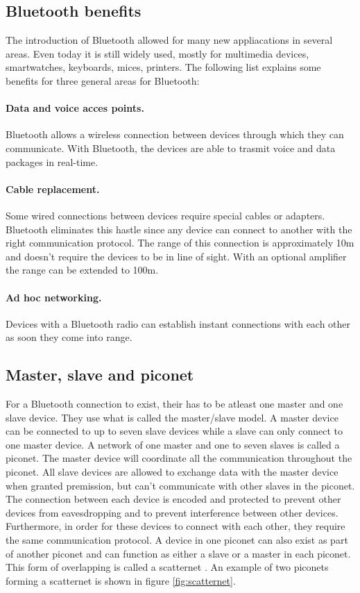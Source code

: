 \documentclass[a4paper, 11pt]{report}
\begin{document}
	\subsection{Bluetooth benefits}
The introduction of Bluetooth allowed for many new appliacations in several areas. Even today it is still widely used, mostly for multimedia devices, smartwatches, keyboards, mices, printers. The following list explains some benefits for three general areas for Bluetooth:
		\paragraph{Data and voice acces points.}
Bluetooth allows a wireless connection between devices through which they can communicate. With Bluetooth, the devices are able to trasmit voice and data packages in real-time.
		\paragraph{Cable replacement.}
Some wired connections between devices require special cables or adapters. Bluetooth eliminates this hastle since any device can connect to another with the right communication protocol. The range of this connection is approximately 10m and doesn't require the devices to be in line of sight. With an optional amplifier the range can be extended to 100m.
		\paragraph{Ad hoc networking.}
Devices with a Bluetooth radio can establish instant connections with each other as soon they come into range.


	\subsection{Master, slave and piconet}
For a Bluetooth connection to exist, their has to be atleast one master and one slave device. They use what is called the master/slave model. A master device can be connected to up to seven slave devices while a slave can only connect to one master device. A network of one master and one to seven slaves is called a piconet. The master device will coordinate all the communication throughout the piconet. All slave devices are allowed to exchange data with the master device when granted premission, but can't communicate with other slaves in the piconet. The connection between each device is encoded and protected to prevent other devices from eavesdropping and to prevent interference between other devices. Furthermore, in order for these devices to connect with each other, they require the same communication protocol. A device in one piconet can also exist as part of another piconet and can function as either a slave or a master in each piconet. This form of overlapping is called a scatternet \cite{introBluetooth}. An example of two piconets forming a scatternet is shown in figure \ref{fig:scatternet}.
\end{document}
